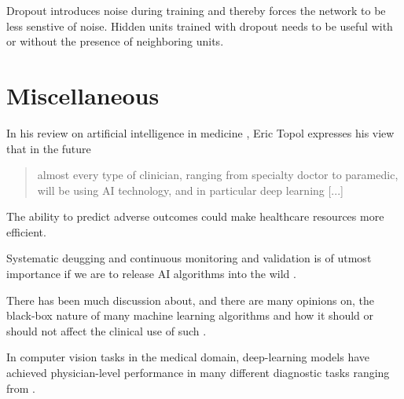 Dropout introduces noise during training
and thereby forces the network to be less senstive of noise.
Hidden units trained with dropout needs to be useful 
with or without the presence of neighboring units.


\section{Miscellaneous}

In his review on artificial intelligence in medicine%
\autocite{topolHighperformance2019}, 
Eric Topol expresses his view that in the future
\blockquote{%
almost every type of clinician, ranging from specialty doctor to paramedic,
will be using AI technology, and in particular deep learning [...]
}.

The ability to predict adverse outcomes could make  
healthcare resources more efficient.

Systematic deugging and continuous monitoring and validation 
is of utmost importance if we are to release AI algorithms into the wild%
\autocite{topolHighperformance2019}.

There has been much discussion about, and there are many opinions on, 
the black-box nature of many machine learning algorithms and 
how it should or should not affect the clinical use of such 
\autocite{topolHighperformance2019, gunningXAI2019, vanderveldenExplainable2022}.


In computer vision tasks in the medical domain,
deep-learning models have achieved physician-level performance
in many different diagnostic tasks
ranging from .
